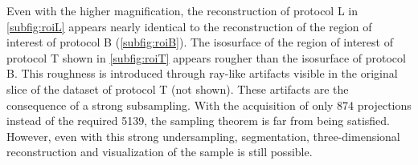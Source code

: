 Even with the higher magnification, the reconstruction of protocol L in \autoref{subfig:roiL} appears nearly identical to the reconstruction of the region of interest of protocol B (\autoref{subfig:roiB}). The isosurface of the region of interest of protocol T shown in \autoref{subfig:roiT} appears rougher than the isosurface of protocol B. This roughness is introduced through ray-like artifacts visible in the original slice of the dataset of protocol T (not shown). These artifacts are the consequence of a strong subsampling. With the acquisition of only 874 projections instead of the required 5139, the sampling theorem is far from being satisfied. However, even with this strong undersampling, segmentation, three-dimensional reconstruction and visualization of the sample is still possible.

\renewcommand{\imsize}{.47\linewidth}%
